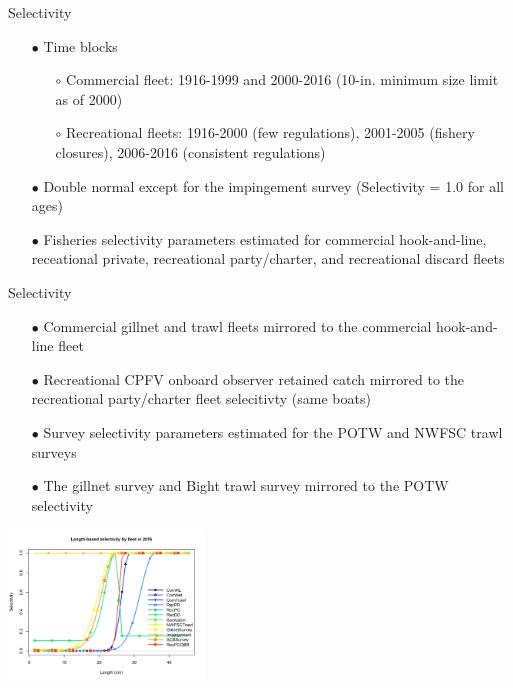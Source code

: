 \documentclass[ignorenonframetext,]{beamer}
\begin{document}
\begin{frame}{Selectivity}

\begin{itemize}
\item[$\bullet$] Time blocks
\begin{itemize}
\item[$\circ$] Commercial fleet: 1916-1999 and 2000-2016 (10-in. minimum size limit as of 2000)
\item[$\circ$] Recreational fleets: 1916-2000 (few regulations), 2001-2005 (fishery closures), 2006-2016 (consistent regulations)
\end{itemize}
\item[$\bullet$] Double normal except for the impingement survey (Selectivity = 1.0 for all ages)
\item[$\bullet$] Fisheries selectivity parameters estimated for commercial hook-and-line, receational private, recreational party/charter, and recreational discard fleets
\end{itemize}

\end{frame}

\begin{frame}{Selectivity}

\begin{itemize}
\item[$\bullet$] Commercial gillnet and trawl fleets mirrored to the commercial hook-and-line fleet
\item[$\bullet$] Recreational CPFV onboard observer retained catch mirrored to the recreational party/charter fleet selecitivty (same boats)
\item[$\bullet$] Survey selectivity parameters estimated for the POTW and NWFSC trawl surveys
\item[$\bullet$] The gillnet survey and Bight trawl survey mirrored to the POTW selectivity 
\end{itemize}

\centering
\includegraphics[height=4cm]{r4ss/plots_mod1/sel01_multiple_fleets_length1.png}

\end{frame}
\end{document}
